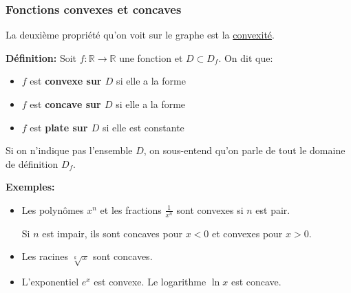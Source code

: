 \documentclass[10pt]{beamer}
\newcommand{\bitem}{\item[$\bullet$]}
\newcommand{\R}{\mathbb R}
\begin{document}
\begin{frame}[plain]
\frametitle{\bf Fonctions convexes et concaves}
\medskip 

{\small 
La deuxi\`eme propri\'et\'e qu'on voit sur le graphe est la 
\underline{convexit\'e}.}
\vspace*{2mm}

{\bf D\'efinition:} 
Soit $f:\R\rightarrow\R$ une fonction et $D\subset D_f$. On dit que: 
\vspace*{1mm}

\begin{itemize}
\bitem
\parbox[t]{6cm}{
$f$ est {\bf convexe sur $D$} si elle a la forme 
}
\quad
\raisebox{-.5\height}{\convexe}  
\vspace*{1mm}

\bitem
\parbox[t]{6cm}{
$f$ est {\bf concave sur $D$} si elle a la forme
}
\quad
\raisebox{-.5\height}{\concave} 
\vspace*{1mm}

\bitem
\parbox[t]{6cm}{
$f$ est {\bf plate sur $D$} si elle est constante
}
\quad
\raisebox{-.5\height}{\constant}  
\end{itemize} 
\vspace*{1mm}

\pause
{\small
Si on n'indique pas l'ensemble $D$, on sous-entend qu'on parle de tout le 
domaine de d\'efinition $D_f$.
} 
\vspace*{2mm}

\pause
{\small 
{\bf Exemples:}
\begin{itemize}
\bitem
Les polyn\^omes $x^n$ et les fractions $\frac{1}{x^n}$ sont convexes si $n$ 
est pair. 
\vspace*{1mm}

Si $n$ est impair, ils sont concaves pour $x<0$ et convexes pour $x>0$.  
\vspace*{1mm}

\bitem
Les racines $\sqrt[k]{x}$ sont concaves. 
\vspace*{1mm}

\bitem
L'exponentiel $e^x$ est convexe. Le logarithme $\ln x$ est concave. 
\end{itemize} 
}

\end{frame}

\end{document}
